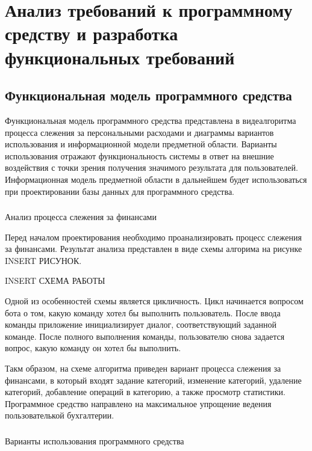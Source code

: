 \section{Анализ требований к программному средству и разработка функциональных требований}
\label{sec:domain}

\subsection{Функциональная модель программного средства}
\label{sec:domain:model}

Функциональная модель программного средства представлена в виде алгоритма процесса слежения за персональными расходами и диаграммы вариантов использования и информационной модели предметной области. Варианты использования отражают функциональность системы в ответ на внешние воздействия с точки зрения получения значимого результата для пользователей. Информационная модель предметной области в дальнейшем будет использоваться при проектировании базы данных для программного средства.

\subsubsection{} Анализ процесса слежения за финансами
\label{sec:domain:model:deeds}

Перед началом проектирования необходимо проанализировать процесс слежения за финансами. Результат анализа представлен в виде схемы алгорима на рисунке INSERT РИСУНОК. 

INSERT СХЕМА РАБОТЫ

Одной из особенностей схемы является цикличность. Цикл начинается вопросом бота о том, какую команду хотел бы выполнить пользователь. После ввода команды приложение инициализирует диалог, соответствующий заданной команде. После полного выполнения команды, пользователю снова задается вопрос, какую команду он хотел бы выполнить.

Такм образом, на схеме алгоритма приведен вариант процесса слежения за финансами, в который входят задание категорий, изменение категорий, удаление категорий, добавление операций в категорию, а также просмотр статистики. Программное средство направлено на максимальное упрощение ведения пользователькой бухгалтерии.

\subsubsection{} Варианты использования программного средства
\label{sec:domain:model:use_cases}


